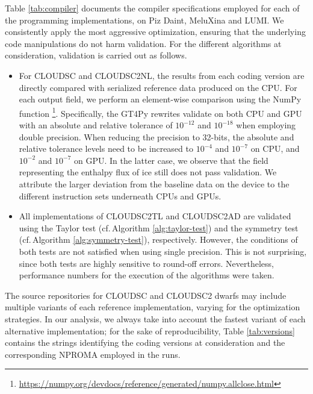 \documentclass[main.tex]{subfiles}
\begin{document}
        \noindent Table \ref{tab:compiler} documents the compiler specifications employed for each of the programming implementations, on Piz Daint, MeluXina and LUMI. We consistently apply the most aggressive optimization, ensuring that the underlying code manipulations do not harm validation. For the different algorithms at consideration, validation is carried out as follows.
        \begin{itemize}
            \item For CLOUDSC and CLOUDSC2NL, the results from each coding version are directly compared with serialized reference data produced on the CPU. For each output field, we perform an element-wise comparison using the NumPy function \footnote{\url{https://numpy.org/devdocs/reference/generated/numpy.allclose.html}}. Specifically, the GT4Py rewrites validate on both CPU and GPU with an absolute and relative tolerance of $10^{-12}$ and $10^{-18}$ when employing double precision. When reducing the precision to 32-bits, the absolute and relative tolerance levels need to be increased to $10^{-4}$ and $10^{-7}$ on CPU, and $10^{-2}$ and $10^{-7}$ on GPU. In the latter case, we observe that the field representing the enthalpy flux of ice still does not pass validation. We attribute the larger deviation from the baseline data on the device to the different instruction sets underneath CPUs and GPUs.
            \item All implementations of CLOUDSC2TL and CLOUDSC2AD are validated using the Taylor test (cf.\,Algorithm \ref{alg:taylor-test}) and the symmetry test (cf.\,Algorithm \ref{alg:symmetry-test}), respectively. However, the conditions of both tests are not satisfied when using single precision. This is not surprising, since both tests are highly sensitive to round-off errors. Nevertheless, performance numbers for the execution of the algorithms were taken.
        \end{itemize}
        \noindent The source repositories for CLOUDSC and CLOUDSC2 dwarfs may include multiple variants of each reference implementation, varying for the optimization strategies. In our analysis, we always take into account the fastest variant of each alternative implementation; for the sake of reproducibility, Table \ref{tab:versions} contains the strings identifying the coding versions at consideration and the corresponding NPROMA employed in the runs.
        
\end{document}
